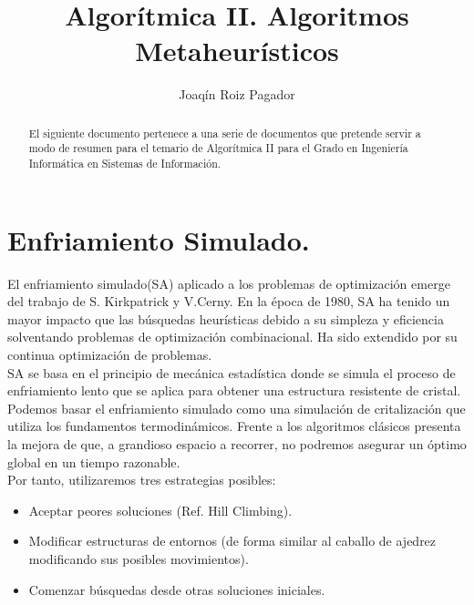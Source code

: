 \documentclass{llncs}
\begin{document}
\title{Algor\'{i}tmica II. Algoritmos Metaheur\'{i}sticos}
%
%
\author{Joaq\'{i}n Roiz Pagador}
%
%
%

\maketitle              %

\begin{abstract}
El siguiente documento pertenece a una serie de documentos que pretende servir a modo de resumen para el temario de Algor\'{i}tmica II para el Grado en Ingenier\'{i}a Inform\'{a}tica en Sistemas de Informaci\'{o}n.\\
\end{abstract}
%
\section*{Enfriamiento Simulado.}
%
El enfriamiento simulado(SA) aplicado a los problemas de optimizaci\'{o}n emerge del trabajo de S. Kirkpatrick y V.Cerny. En la \'{e}poca de 1980, SA ha tenido un mayor impacto que las b\'{u}squedas heur\'{i}sticas debido a su simpleza y eficiencia solventando problemas de optimizaci\'{o}n combinacional. Ha sido extendido por su continua optimizaci\'{o}n de problemas.\\

SA se basa en el principio de mec\'{a}nica estad\'{i}stica donde se simula el proceso de enfriamiento lento que se aplica para obtener una estructura resistente de cristal.\\

Podemos basar el enfriamiento simulado como una simulaci\'{o}n de critalizaci\'{o}n que utiliza los fundamentos termodin\'{a}micos. Frente a los algoritmos cl\'{a}sicos presenta la mejora de que, a grandioso espacio a recorrer, no podremos asegurar un \'{o}ptimo global en un tiempo razonable.\\

Por tanto, utilizaremos tres estrategias posibles:
\begin{itemize}
\item Aceptar peores soluciones (Ref. Hill Climbing).
\item Modificar estructuras de entornos (de forma similar al caballo de ajedrez modificando sus posibles movimientos).
\item Comenzar b\'{u}squedas desde otras soluciones iniciales.
\end{itemize}
\end{document}
